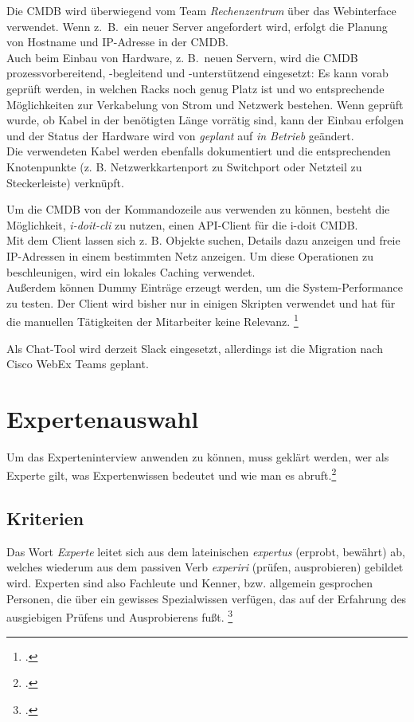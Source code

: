 Die \acs{CMDB} wird überwiegend vom Team \textit{Rechenzentrum} über das Webinterface verwendet. Wenn z.~B.~ein neuer Server angefordert wird, erfolgt die Planung von Hostname und IP-Adresse in der \acs{CMDB}.\\
Auch beim Einbau von Hardware, z. B.~neuen Servern, wird die \acs{CMDB} prozessvorbereitend, -begleitend und -unterstützend eingesetzt: Es kann vorab geprüft werden, in welchen Racks noch genug Platz ist und wo entsprechende Möglichkeiten zur Verkabelung von Strom und Netzwerk bestehen. Wenn geprüft wurde, ob Kabel in der benötigten Länge vorrätig sind, kann der Einbau erfolgen und der Status der Hardware wird von \textit{geplant} auf \textit{in Betrieb} geändert.\\
Die verwendeten Kabel werden ebenfalls dokumentiert und die entsprechenden Knotenpunkte (z. B. Netzwerkkartenport zu Switchport oder Netzteil zu Steckerleiste) verknüpft.

Um die \acs{CMDB} von der Kommandozeile aus verwenden zu können, besteht die Möglichkeit, \textit{i-doit-cli} zu nutzen, einen \acf{API}-Client für die i-doit \acs{CMDB}.\\
Mit dem Client lassen sich z. B. Objekte suchen, Details dazu anzeigen und freie IP-Adressen in einem bestimmten Netz anzeigen. Um diese Operationen zu beschleunigen, wird ein lokales Caching verwendet.\\
Außerdem können Dummy Einträge erzeugt werden, um die System-Performance zu testen. Der Client wird bisher nur in einigen Skripten verwendet und hat für die manuellen Tätigkeiten der Mitarbeiter keine Relevanz.
\footcite[Vgl.][o. \pno]{Heisig_2019_idoitcli}

Als Chat-Tool wird derzeit Slack eingesetzt, allerdings ist die Migration nach Cisco WebEx Teams geplant. 


\section{Expertenauswahl}
Um das Experteninterview anwenden zu können, muss geklärt werden, wer als Experte gilt, was Expertenwissen bedeutet und wie man es abruft.\footcite[Vgl.][6\psq]{Bogner_2014_Interview}

\subsection{Kriterien}
Das Wort \textit{Experte} leitet sich aus dem lateinischen \textit{expertus} (erprobt, bewährt) ab, welches wiederum aus dem passiven Verb \textit{experiri} (prüfen, ausprobieren) gebildet wird. Experten sind also Fachleute und Kenner, bzw. allgemein gesprochen Personen, die über ein gewisses Spezialwissen verfügen, das auf der Erfahrung des ausgiebigen Prüfens und Ausprobierens fußt. \footcite[Vgl.][9]{Bogner_2014_Interview}


